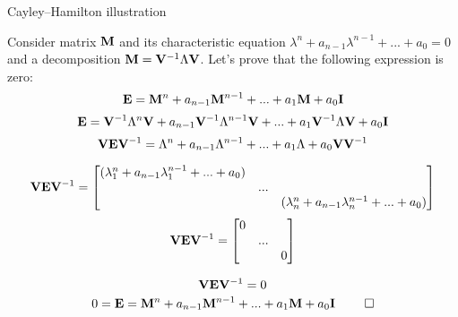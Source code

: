 \documentclass{beamer}
\begin{document}
\begin{frame}{Cayley–Hamilton illustration}
	\begin{flushleft}
		
		Consider matrix $\mathbf{M}$ and its characteristic equation $\lambda^n + a_{n-1}\lambda^{n-1} + ... + a_0  = 0$ and a decomposition $\mathbf{M} = \mathbf{V}^{-1}\Lambda \mathbf{V}$. Let's prove that the following expression is zero:
		\begin{equation}
			\mathbf{E} = \mathbf{M}^n + a_{n-1}\mathbf{M}^{n-1} + ... + a_1\mathbf{M} + a_0\mathbf{I}
		\end{equation}	
		\begin{equation}
		\mathbf{E} = \mathbf{V}^{-1}\Lambda^n \mathbf{V} + a_{n-1}\mathbf{V}^{-1}\Lambda^{n-1} \mathbf{V} + ... + a_1\mathbf{V}^{-1}\Lambda \mathbf{V} + a_0\mathbf{I}
		\end{equation}	
		\begin{equation}
		 \mathbf{V}\mathbf{E} \mathbf{V}^{-1} = \Lambda^n + a_{n-1}\Lambda^{n-1}  + ... + a_1\Lambda+ a_0\mathbf{V}\mathbf{V}^{-1} 
		\end{equation}	
		\begin{small}
			\begin{equation}
				\mathbf{V}\mathbf{E} \mathbf{V}^{-1} = 
				\begin{bmatrix}
					(\lambda_1^n + a_{n-1}\lambda_1^{n-1} + ... + a_0 ) & & \\
					& ... & \\
					& & (\lambda_n^n + a_{n-1}\lambda_n^{n-1} + ... + a_0 )
				\end{bmatrix}
			\end{equation}	
		\begin{equation}
		\mathbf{V}\mathbf{E} \mathbf{V}^{-1} = 
		\begin{bmatrix}
			0 & & \\
			& ... & \\
			& & 0
		\end{bmatrix}
		\end{equation}	
	\end{small}
		\begin{equation}
		\mathbf{V}\mathbf{E} \mathbf{V}^{-1} = 0
		\end{equation}	
		\begin{equation}
		0 = \mathbf{E} = \mathbf{M}^n + a_{n-1}\mathbf{M}^{n-1} + ... + a_1\mathbf{M} + a_0\mathbf{I} \ \qed
		\end{equation}	
		
		
	\end{flushleft}
\end{frame}
\end{document}
